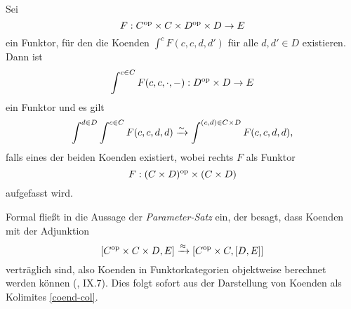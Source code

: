 \begin{lemma}
  \label{coend-fubini}
  Sei
  \[ F: C^\mathrm{op} \times C \times D^\mathrm{op} \times D \to E \]
  ein Funktor, für den die Koenden $\int^c F(c, c, d, d')$ für alle
  $d, d' \in D$ existieren. Dann ist
  \[ \int^{c \in C} F(c, c, \cdot, -): D^\mathrm{op} \times D \to E \]
  ein Funktor und es gilt
  \[ \int^{d \in D} \int^{c \in C} F(c, c, d, d)
  \xrightarrow[]{\sim} \int^{(c, d) \in C \times D} F(c, c, d, d),
  \]
  falls eines der beiden Koenden existiert, wobei rechts $F$ als
  Funktor
  \[ F: (C \times D)^\mathrm{op} \times (C \times D) \]
  aufgefasst wird.
\end{lemma}
\begin{bem}
  Formal fließt in die Aussage der \emph{Parameter-Satz} ein, der
  besagt, dass Koenden mit der Adjunktion
  \[[C^\mathrm{op} \times C \times D, E] \xrightarrow{\approx} {[C^\mathrm{op} \times C, [D, E]]} \]
  verträglich sind, also Koenden in Funktorkategorien objektweise
  berechnet werden können (\cite{ML}, IX.7). Dies folgt sofort aus der
  Darstellung von Koenden als Kolimites \ref{coend-col}.
\end{bem}
